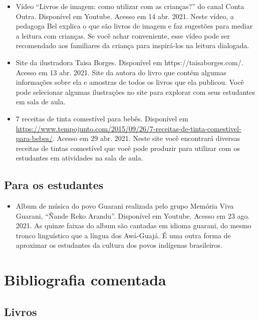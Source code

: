\documentclass[11pt]{extarticle}
\begin{document}
{{\begin{itemize}
\item Vídeo “Livros de imagem: como utilizar com as crianças?” do canal Conta Outra. Disponível em Youtube. 
Acesso em 14 abr. 2021. 
Neste vídeo, a pedagoga Bel explica o que são livros de imagem e faz sugestões para mediar a leitura com 
crianças. Se você achar conveniente, esse vídeo pode ser recomendado aos familiares da criança 
para inspirá-los na leitura dialogada. 

\item Site da ilustradora Taisa Borges. Disponível em https://taisaborges.com/. Acesso em 13 abr. 2021. 
Site da autora do livro que contém algumas informações sobre ela e amostras de todos os livros que ela publicou. 
Você pode selecionar algumas ilustrações no site para explorar com seus estudantes em sala de aula. 

\item 7 receitas de tinta comestível para bebês. 
Disponível em \url{https://www.tempojunto.com/2015/09/26/7-receitas-de-tinta-comestivel-para-bebes/}. 
Acesso em 29 abr. 2021. 
Neste site você encontrará diversas receitas de tintas comestível que você pode produzir 
para utilizar com os estudantes em atividades na sala de aula. 
\end{itemize}

\subsection{Para os estudantes}
\begin{itemize}

\item Album de música do povo Guarani realizada pelo grupo Memória Viva Guarani,
``Ñande Reko Arandu''. Disponível em Youtube. Acesso em 23 ago. 2021. 
As quinze faixas do album são cantadas em idioma guarani, do mesmo tronco 
linguístico que a língua dos Awá-Guajá. É uma outra forma de aproximar 
os estudantes da cultura dos povos indígenas brasileiros. 


\end{itemize}


\section{Bibliografia comentada}

\subsection{Livros}

}}
\end{document}
